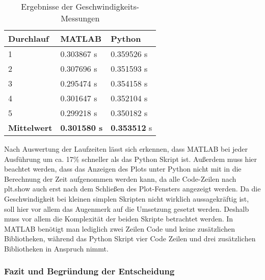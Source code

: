 \begin{table}[H]
	\centering
	\begin{tabular}{|l|l|l|}
		\multicolumn{1}{l}{\textbf{Durchlauf}} & \multicolumn{1}{l}{\textbf{MATLAB}} & \multicolumn{1}{l}{\textbf{Python}}  \\ 
		\hline
		1                                      & 0.303867 s                          & 0.359526
		s                           \\ 
		\hline
		2                                      & 0.307696
		s                          & 0.351593
		s                           \\ 
		\hline
		3                                      & 0.295474
		s                          & 0.354158
		s                           \\ 
		\hline
		4                                      & 0.301647 s                          & 0.352104 s                           \\ 
		\hline
		5                                      & 0.299218 s                          & 0.350182 s                           \\ 
		\hline
		\textbf{Mittelwert}                    & \textbf{0.301580 s}                          & \textbf{0.353512} s                           \\
		\hline
	\end{tabular}
		\caption{Ergebnisse der Geschwindigkeits-Messungen}
\end{table}

Nach Auswertung der Laufzeiten lässt sich erkennen, dass MATLAB bei jeder Ausführung um ca. 17\% schneller als das Python Skript ist. Außerdem muss hier beachtet werden, dass das Anzeigen des Plots unter Python nicht mit in die Berechnung der Zeit aufgenommen werden kann, da alle Code-Zeilen nach \glqq plt.show\grqq{} auch erst nach dem Schließen des Plot-Fensters angezeigt werden. Da die Geschwindigkeit bei kleinen simplen Skripten nicht wirklich aussagekräftig ist, soll hier vor allem das Augenmerk auf die Umsetzung gesetzt werden. Deshalb muss vor allem die Komplexität der beiden Skripte betrachtet werden. In MATLAB benötigt man lediglich zwei Zeilen Code und keine zusätzlichen Bibliotheken, während das Python Skript vier Code Zeilen und drei zusätzlichen Bibliotheken in Anspruch nimmt.

\subsubsection{Fazit und Begründung der Entscheidung}

